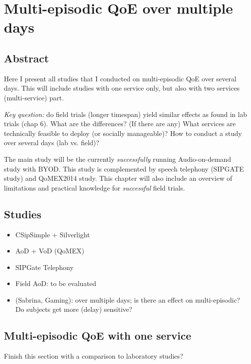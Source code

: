 \chapter{Multi-episodic QoE over multiple days}\label{chap:07}
\section*{Abstract}
Here I present all studies that I conducted on multi-episodic QoE over several days.
This will include studies with one service only, but also with two services (multi-service) part.

\textit{Key question:} do field trials (longer timespan) yield similar effects as found in lab trials (chap 6).
What are the differences? (If there are any)
What services are technically feasible to deploy (or socially manageable)?
How to conduct a study over several days (lab vs. field)?

The main study will be the currently \textit{successfully} running Audio-on-demand study with BYOD.
This study is complemented by speech telephony (SIPGATE study) and QoMEX2014 study.
This chapter will also include an overview of limitations and practical knowledge for \textit{successful} field trials.

\section{Studies}
\begin{itemize}
\item CSipSimple + Silverlight
\item AoD + VoD (QoMEX)
\item SIPGate Telephony
\item Field AoD: to be evaluated
\item (Sabrina, Gaming): over multiple days; is there an effect on multi-episodic? Do subjects get more (delay) sensitive?
\end{itemize}

\section{Multi-episodic QoE with one service}


Finish this section with a comparison to laboratory studies?

